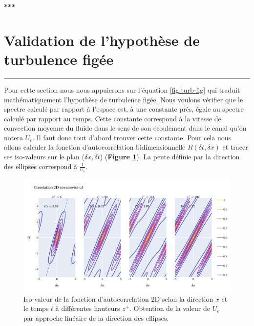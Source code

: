 \documentclass[12pt]{article}
\theoremstyle{plain}
\theoremstyle{remark}
\begin{document}
\begin{center}
	\large {\bf{***}}
\end{center}

\vspace{0.3cm}
\section{Validation de l'hypothèse de turbulence figée}
\noindent\rule{\linewidth}{2pt}
\vspace{0.1cm}

Pour cette section nous nous appuierons sur l'équation \ref{fig:turb-fig} qui traduit mathématiquement l'hypothèse de turbulence figée. Nous voulons vérifier que le spectre calculé par rapport à l'espace est, à une constante près, égale au spectre calculé par rapport au temps. Cette constante correspond à la vitesse de convection moyenne du fluide dans le sens de son écoulement dans le canal qu'on notera $U_c$. Il faut donc tout d'abord trouver cette constante. Pour cela nous allons calculer la fonction d'autocorrelation bidimensionnelle $R(\delta t, \delta x)$ et tracer ses iso-valeurs sur le plan ($\delta x, \delta t$) ({\bf Figure \ref{fig:corr-2d}}). La pente définie par la direction des ellipses correspond à $\frac{1}{U_c}$.

\begin{figure}[H]
	\begin{center}
		\includegraphics[width=0.9\linewidth]{../../output/figures/channel_wrles_retau395/split_time/frozen_turbulence/correlation2D/u1.png}
		\caption{Iso-valeur de la fonction d'autocorrelation 2D selon la direction $x$ et le temps $t$ à différentes hauteurs $z^+$. Obtention de la valeur de $U_c$ par approche linéaire de la direction des ellipses.}
		\label{fig:corr-2d}
	\end{center}
\end{figure}
\end{document}
